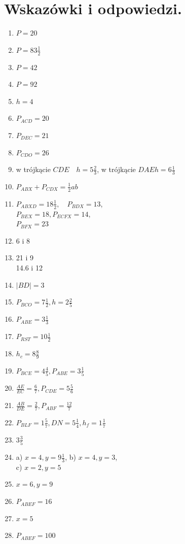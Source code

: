 \documentclass[10pt]{article}
\begin{document}
\section*{Wskazówki i odpowiedzi.}
\begin{enumerate}
  \item \(P=20\)
  \item \(P=83 \frac{1}{2}\)
  \item \(P=42\)
  \item \(P=92\)
  \item \(h=4\)
  \item \(P_{A C D}=20\)
  \item \(P_{D E C}=21\)
  \item \(P_{C D O}=26\)
  \item w trójkącie \(C D E \quad h=5 \frac{2}{3}\), w trójkącie \(D A E h=6 \frac{1}{3}\)
  \item \(P_{A B X}+P_{C D X}=\frac{1}{2} a b\)
  \item \(P_{A B X D}=18 \frac{1}{2}, \quad P_{B D X}=13\),\\
\(P_{B E X}=18, P_{E C F X}=14\),\\
\(P_{B F X}=23\)
  \item 6 i 8
  \item 21 i 9\\
14.6 i 12
  \item \(|B D|=3\)
  \item \(P_{B C O}=7 \frac{1}{2}, h=2 \frac{2}{5}\)
  \item \(P_{A B E}=3 \frac{1}{3}\)
  \item \(P_{R S T}=10 \frac{1}{2}\)
  \item \(h_{c}=8 \frac{8}{9}\)
  \item \(P_{B C E}=4 \frac{4}{5}, P_{A B E}=3 \frac{1}{5}\)
  \item \(\frac{A E}{E C}=\frac{6}{7}, P_{C D E}=5 \frac{5}{6}\)
  \item \(\frac{A B}{D E}=\frac{2}{7}, P_{A B F}=\frac{12}{7}\)
  \item \(P_{B L F}=1 \frac{5}{7}, D N=5 \frac{1}{4}, h_{f}=1 \frac{1}{7}\)
  \item \(3 \frac{3}{5}\)
  \item a) \(x=4, y=9 \frac{1}{3}\), b) \(x=4, y=3\),\\
c) \(x=2, y=5\)
  \item \(x=6, y=9\)
  \item \(P_{A B E F}=16\)
  \item \(x=5\)
  \item \(P_{A B E F}=100\)

\end{enumerate}
\end{document}
